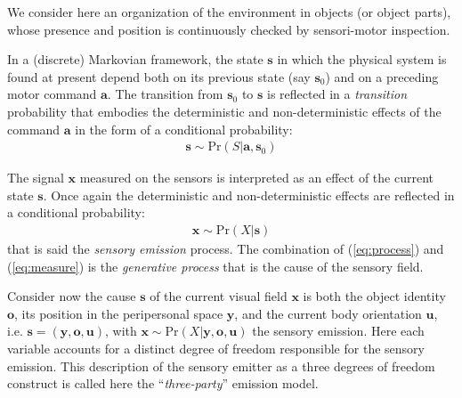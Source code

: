 \documentclass[12pt,twoside,openright]{article}
\begin{document}
We consider here an organization of the environment in objects (or object parts), whose presence and position is continuously checked by sensori-motor inspection.
{\color{Purple} 
In a (discrete) Markovian framework, the state $\boldsymbol{s}$ in which the physical system is found at present depend both on its previous state (say $\boldsymbol{s}_0$) and on a preceding motor command $\boldsymbol{a}$.
The transition from $\boldsymbol{s}_0$ to $\boldsymbol{s}$ is reflected in a \emph{transition} probability that embodies the deterministic and non-deterministic effects of the command $\boldsymbol{a}$ in the form of a conditional probability:  
\begin{align}
\boldsymbol{s} \sim \text{Pr}(S|\boldsymbol{a},\boldsymbol{s}_0) \label{eq:process}
\end{align}


The signal $\boldsymbol{x}$ measured on the sensors is interpreted as an effect of the current state $\boldsymbol{s}$. Once again the deterministic and non-deterministic effects are reflected in a conditional probability:
\begin{align}
\boldsymbol{x} \sim \text{Pr}(X|\boldsymbol{s})\label{eq:measure}
\end{align}
that is said the \emph{sensory emission} process.
The combination of  (\ref{eq:process}) and (\ref{eq:measure}) is the \emph{generative process} that is the cause of the sensory field.}
{\color{Purple} Consider now} the cause $\boldsymbol{s}$ of the current visual field $\boldsymbol{x}$ is both the object identity $\boldsymbol{o}$, its position in the peripersonal space $\boldsymbol{y}$, and the current body orientation  $\boldsymbol{u}$, i.e. $\boldsymbol{s} = (\boldsymbol{y},\boldsymbol{o},\boldsymbol{u})$, with $\boldsymbol{x} \sim \text{Pr}(X|\boldsymbol{y},\boldsymbol{o},\boldsymbol{u})$ {\color{Purple}the  sensory emission. Here} each variable accounts for a distinct degree of freedom {\color{Purple} responsible for the sensory emission}. This description of the sensory emitter as a three degrees of freedom construct is called here the ``\emph{three-party}'' emission model.
\end{document}
